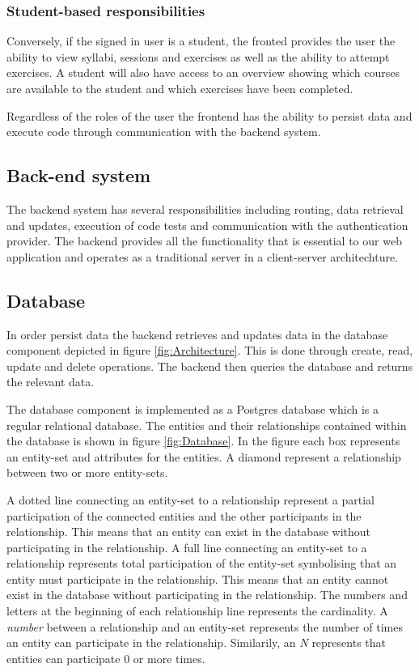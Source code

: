 \subsubsection*{Student-based responsibilities}
Conversely, if the signed in user is a student, the fronted provides the user the ability to view syllabi, sessions and exercises as well as the ability to attempt exercises. A student will also have access to an overview showing which courses are available to the student and which exercises have been completed. 

\vspace{0.5cm}

Regardless of the roles of the user the frontend has the ability to persist data and execute code through communication with the backend system.

\subsection{Back-end system}
The backend system has several responsibilities including routing, data retrieval and updates, execution of code tests and communication with the authentication provider. The backend provides all the functionality that is essential to our web application and operates as a traditional server in a client-server architechture. 

\subsection{Database}
In order persist data the backend retrieves and updates data in the database component depicted in figure \ref{fig:Architecture}. This is done through create, read, update and delete operations. 
The backend then queries the database and returns the relevant data. 

The database component is implemented as a Postgres database which is a regular relational database. The entities and their relationships contained within the database is shown in figure \ref{fig:Database}. In the figure each box represents an entity-set and attributes for the entities. A diamond represent a relationship between two or more entity-sets.

A dotted line connecting an entity-set to a relationship represent a partial participation of the connected entities and the other participants in the relationship. This means that an entity can exist in the database without participating in the relationship.
A full line connecting an entity-set to a relationship represents total participation of the entity-set symbolising that an entity must participate in the relationship. 
This means that an entity cannot exist in the database without participating in the relationship.
The numbers and letters at the beginning of each relationship line represents the cardinality. A \textit{number} between a relationship and an entity-set represents the number of times an entity can participate in the relationship. Similarily, an \textit{N} represents that entities can participate $0$ or more times.

